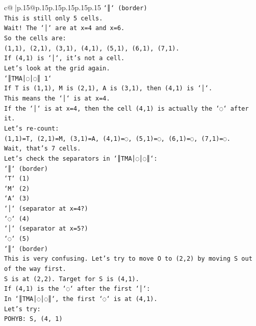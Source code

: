 \documentclass{article}
\begin{document}
{\begin{supertabular}{c@{$\;$}|p{.15\linewidth}@{}p{.15\linewidth}p{.15\linewidth}p{.15\linewidth}p{.15\linewidth}p{.15\linewidth}}
{{{\texttt{`║` (border)} \\
\texttt{This is still only 5 cells.} \\
\texttt{Wait! The `│` are at x=4 and x=6.} \\
\texttt{So the cells are:} \\
\texttt{(1,1), (2,1), (3,1), (4,1), (5,1), (6,1), (7,1).} \\
\texttt{If (4,1) is `│`, it's not a cell.} \\
\texttt{Let's look at the grid again.} \\
\texttt{`║TMA│◌│◌║ 1`} \\
\texttt{If T is (1,1), M is (2,1), A is (3,1), then (4,1) is `│`.} \\
\texttt{This means the `│` is at x=4.} \\
\texttt{If the `│` is at x=4, then the cell (4,1) is actually the `◌` after it.} \\
\texttt{Let's re{-}count:} \\
\texttt{(1,1)=T, (2,1)=M, (3,1)=A, (4,1)=◌, (5,1)=◌, (6,1)=◌, (7,1)=◌.} \\
\texttt{Wait, that's 7 cells.} \\
\texttt{Let's check the separators in `║TMA│◌│◌║`:} \\
\texttt{`║` (border)} \\
\texttt{`T` (1)} \\
\texttt{`M` (2)} \\
\texttt{`A` (3)} \\
\texttt{`│` (separator at x=4?)} \\
\texttt{`◌` (4)} \\
\texttt{`│` (separator at x=5?)} \\
\texttt{`◌` (5)} \\
\texttt{`║` (border)} \\
\texttt{This is very confusing. Let's try to move O to (2,2) by moving S out of the way first.} \\
\texttt{S is at (2,2). Target for S is (4,1).} \\
\texttt{If (4,1) is the `◌` after the first `│`:} \\
\texttt{In `║TMA│◌│◌║`, the first `◌` is at (4,1).} \\
\texttt{Let's try:} \\
\texttt{POHYB: S, (4, 1)} \\
            }
        }
    }
     \\ \\


\end{supertabular}}
\end{document}
